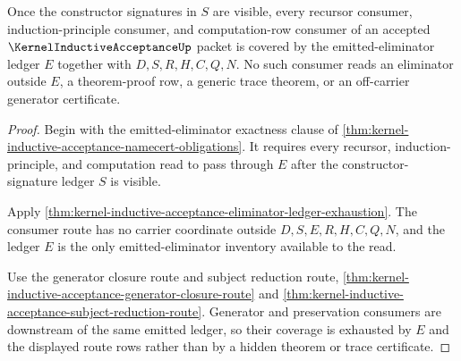 \begin{theorem}
\label{thm:kernel-inductive-acceptance-emitted-eliminator-consumer-coverage}
Once the constructor signatures in $S$ are visible, every recursor consumer, induction-principle consumer, and computation-row consumer of an accepted $\KernelInductiveAcceptanceUp$ packet is covered by the emitted-eliminator ledger $E$ together with $D,S,R,H,C,Q,N$. No such consumer reads an eliminator outside $E$, a theorem-proof row, a generic trace theorem, or an off-carrier generator certificate.
\end{theorem}
\begin{proof}
Begin with the emitted-eliminator exactness clause of \autoref{thm:kernel-inductive-acceptance-namecert-obligations}. It requires every recursor, induction-principle, and computation read to pass through $E$ after the constructor-signature ledger $S$ is visible.

Apply \autoref{thm:kernel-inductive-acceptance-eliminator-ledger-exhaustion}. The consumer route has no carrier coordinate outside $D,S,E,R,H,C,Q,N$, and the ledger $E$ is the only emitted-eliminator inventory available to the read.

Use the generator closure route and subject reduction route, \autoref{thm:kernel-inductive-acceptance-generator-closure-route} and \autoref{thm:kernel-inductive-acceptance-subject-reduction-route}. Generator and preservation consumers are downstream of the same emitted ledger, so their coverage is exhausted by $E$ and the displayed route rows rather than by a hidden theorem or trace certificate.
\end{proof}

